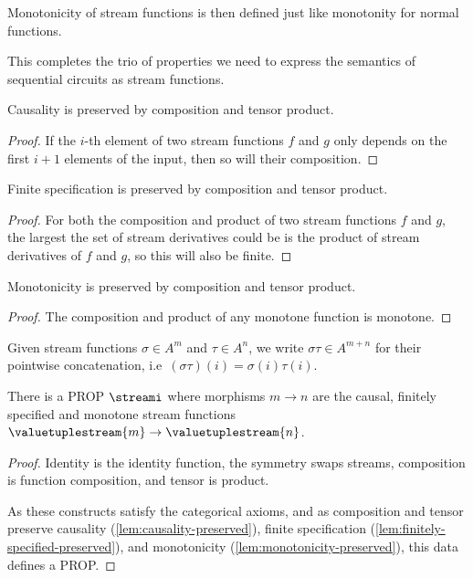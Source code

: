 Monotonicity of stream functions is then defined just like monotonity for normal
functions.

This completes the trio of properties we need to express the semantics of
sequential circuits as stream functions.

\begin{lemma}\label{lem:causality-preserved}
    Causality is preserved by composition and tensor product.
\end{lemma}
\begin{proof}
    If the \(i\)-th element of two stream functions \(f\) and \(g\) only depends
    on the first \(i+1\) elements of the input, then so will their composition.
\end{proof}

\begin{lemma}\label{lem:finitely-specified-preserved}
    Finite specification is preserved by composition and tensor product.
\end{lemma}
\begin{proof}
    For both the composition and product of two stream functions \(f\) and
    \(g\), the largest the set of stream derivatives could be is the product of
    stream derivatives of \(f\) and \(g\), so this will also be finite.
\end{proof}

\begin{lemma}\label{lem:monotonicity-preserved}
    Monotonicity is preserved by composition and tensor product.
\end{lemma}
\begin{proof}
    The composition and product of any monotone function is monotone.
\end{proof}

\begin{notation}
    Given stream functions \(\sigma \in A^m\) and \(\tau \in A^n\), we write
    \(\sigma\tau \in A^{m+n}\) for their pointwise concatenation, i.e\
    \((\sigma\tau)(i) = \sigma(i)\tau(i)\).
\end{notation}

\begin{proposition}
    There is a PROP \(\streami\) where morphisms \(m \to n\) are the causal,
    finitely specified and monotone stream functions \(
    \valuetuplestream{m} \to \valuetuplestream{n}
    \).
\end{proposition}
\begin{proof}
    Identity is the identity function, the symmetry swaps streams, composition
    is function composition, and tensor is product.

    As these constructs satisfy the categorical axioms, and as composition and
    tensor preserve causality (\cref{lem:causality-preserved}),
    finite specification (\cref{lem:finitely-specified-preserved}),
    and monotonicity (\cref{lem:monotonicity-preserved}), this data defines a
    PROP.
\end{proof}

